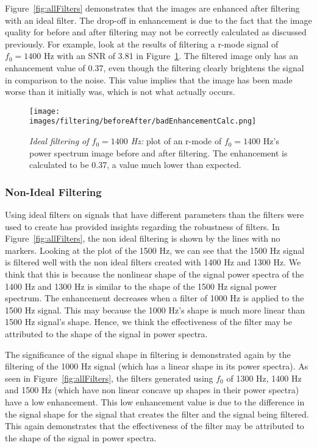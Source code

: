 \documentclass[%
reprint,
amsmath,amssymb,
aps,
]{revtex4-1}
\begin{document}
	
	Figure~\ref{fig:allFilters} demonstrates that the images are enhanced after filtering with an ideal filter. The drop-off in enhancement is due to the fact that the image quality for before and after filtering may not be correctly calculated as discussed previously. For example, look at the results of filtering a r-mode signal of $f_0 = 1400$ Hz with an SNR of 3.81 in Figure~\ref{fig:badEnhancementRatioCalculation}. The filtered image only has an enhancement value of 0.37, even though the filtering clearly brightens the signal in comparison to the noise. This value implies that the image has been made worse than it initially was, which is not what actually occurs. 
	
	\begin{figure}[h]
		\centering
		\texttt{[image: images/filtering/beforeAfter/badEnhancementCalc.png]}
		\caption{\textit{Ideal filtering of $f_0 =1400$ Hz:} plot of an r-mode of $f_0 =1400$ Hz's power spectrum image before and after filtering. The enhancement is calculated to be 0.37, a value much lower than expected.}
		\label{fig:badEnhancementRatioCalculation}
	\end{figure}
	
	\subsubsection{Non-Ideal Filtering}
	Using ideal filters on signals that have different parameters than the filters were used to create has provided insights regarding the robustness of filters. In Figure~\ref{fig:allFilters}, the non ideal filtering is shown by the lines with no markers. Looking at the plot of the 1500 Hz, we can see that the 1500 Hz signal is filtered well with the non ideal filters created with 1400 Hz and 1300 Hz. We think that this is because the nonlinear shape of the signal power spectra of the 1400 Hz and 1300 Hz is similar to the shape of the 1500 Hz signal power spectrum. The enhancement decreases when a filter of 1000 Hz is applied to the 1500 Hz signal. This may because the 1000 Hz's shape is much more linear than 1500 Hz signal's shape. Hence, we think the effectiveness of the filter may be attributed to the shape of the signal in power spectra. 
	
	The significance of the signal shape in filtering is demonstrated again by the filtering of the 1000 Hz signal (which has a linear shape in its power spectra). As seen in Figure~\ref{fig:allFilters}, the filters generated using $f_0$ of 1300 Hz, 1400 Hz and 1500 Hz  (which have non linear concave up shapes in their power spectra) have a low enhancement. This low enhancement value is due to the difference in the signal shape for the signal that creates the filter and the signal being filtered. This again demonstrates that the effectiveness of the filter may be attributed to the shape of the signal in power spectra.
	
\end{document}
